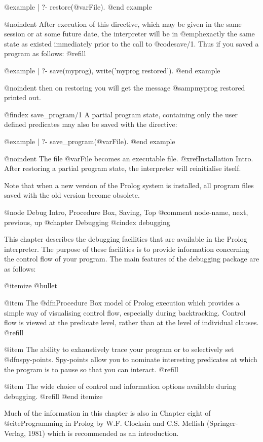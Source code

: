 @example
| ?- restore(@var{File}).
@end example

@noindent
After execution of this directive, which may be given in the same
session or at some future date, the interpreter will be in
@emph{exactly} the same state as existed immediately prior to the call
to @code{save/1}.  Thus if you saved a program as follows: @refill

@example
| ?- save(myprog), write('myprog restored').
@end example

@noindent
then on restoring you will get the message @samp{myprog restored} printed
out.

@findex save_program/1
A partial program state, containing only the user defined predicates may
also be saved with the directive:

@example
| ?- save_program(@var{File}).
@end example

@noindent
The file @var{File} becomes an executable file. @xref{Installation Intro}.
After restoring a partial program state, the interpreter will reinitialise
itself.

Note that when a new version of the Prolog system is installed, all program
files saved with the old version become obsolete.

@node Debug Intro, Procedure Box, Saving, Top
@comment  node-name,  next,  previous,  up
@chapter Debugging
@cindex debugging

This chapter describes the debugging facilities that are available in the
Prolog interpreter.  The purpose of these facilities is to provide
information concerning the control flow of your program.  The main features
of the debugging package are as follows:

@itemize @bullet

@item
The @dfn{Procedure Box} model of Prolog execution which provides a
simple way of visualising control flow, especially during backtracking.
Control flow is viewed at the predicate level, rather than at the level
of individual clauses. @refill

@item
The ability to exhaustively trace your program or to selectively set
@dfn{spy-points}.  Spy-points allow you to nominate interesting
predicates at which the program is to pause so that you can interact.
@refill

@item
The wide choice of control and information options available during
debugging. @refill
@end itemize

Much of the information in this chapter is also in Chapter eight of
@cite{Programming in Prolog} by W.F. Clocksin and C.S. Mellish
(Springer-Verlag, 1981) which is recommended as an introduction.

